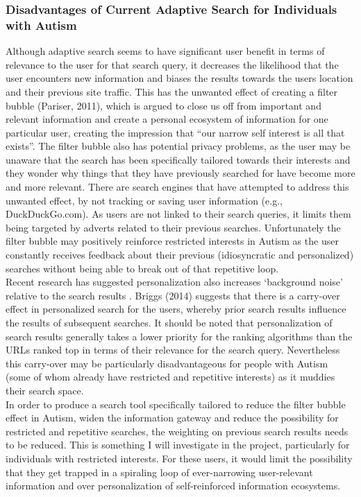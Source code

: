 \documentclass[10pt]{article}
\begin{document}
\subsubsection{Disadvantages of Current Adaptive Search for Individuals with Autism}
Although adaptive search seems to have significant user benefit in terms of relevance to the user for that search query, it decreases the likelihood that the user encounters new information and biases the results towards the users location and their previous site traffic.  This has the unwanted effect of creating a filter bubble (Pariser, 2011), which is argued to close us off from important and relevant information and create a personal ecosystem of information for one particular user, creating the impression that “our narrow self interest is all that exists”. The filter bubble also has potential privacy problems, as the user may be unaware that the search has been specifically tailored towards their interests and they wonder why things that they have previously searched for have become more and more relevant. There are search engines that have attempted to address this unwanted effect, by not tracking or saving user information (e.g., DuckDuckGo.com). As users are not linked to their search queries, it limits them being targeted by adverts related to their previous searches. Unfortunately the filter bubble may positively reinforce restricted interests in Autism as the user constantly receives feedback about their previous (idiosyncratic and personalized) searches without being able to break out of that repetitive loop. \\Recent research has suggested personalization also increases ‘background noise’ relative to the search results \cite{briggs}. Briggs (2014) suggests that there is a carry-over effect in personalized search for the users, whereby prior search results influence the results of subsequent searches. It should be noted that personalization of search results generally takes a lower priority for the ranking algorithms than the URLs ranked top in terms of their relevance for the search query. Nevertheless this carry-over may be particularly disadvantageous for people with Autism (some of whom already have restricted and repetitive interests) as it muddies their search space.\\
In order to produce a search tool specifically tailored to reduce the filter bubble effect in Autism, widen the information gateway and reduce the possibility for restricted and repetitive searches, the weighting on previous search results needs to be reduced. This is something I will investigate in the project, particularly for individuals with restricted interests. For these users, it would limit the possibility that they get trapped in a spiraling loop of ever-narrowing user-relevant information and over personalization of self-reinforced information ecosystems.
\end{document}
